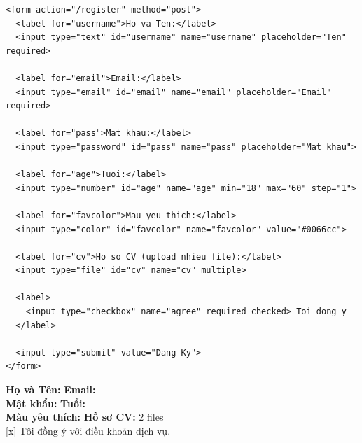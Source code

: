\begin{codeWindow}
\begin{lstlisting}[language=HTML5]
<form action="/register" method="post">
  <label for="username">Ho va Ten:</label>
  <input type="text" id="username" name="username" placeholder="Ten" required>
  
  <label for="email">Email:</label>
  <input type="email" id="email" name="email" placeholder="Email" required>
  
  <label for="pass">Mat khau:</label>
  <input type="password" id="pass" name="pass" placeholder="Mat khau">
  
  <label for="age">Tuoi:</label>
  <input type="number" id="age" name="age" min="18" max="60" step="1">
  
  <label for="favcolor">Mau yeu thich:</label>
  <input type="color" id="favcolor" name="favcolor" value="#0066cc">
  
  <label for="cv">Ho so CV (upload nhieu file):</label>
  <input type="file" id="cv" name="cv" multiple>
  
  <label>
    <input type="checkbox" name="agree" required checked> Toi dong y
  </label>
  
  <input type="submit" value="Dang Ky">
</form>
\end{lstlisting}
\end{codeWindow}

\begin{browserWindow}
\sffamily\small
\begin{tcolorbox}[colback=white, colframe=primaryBlue!20, arc=4pt, boxrule=0.6pt, left=8pt, right=8pt, top=8pt, bottom=8pt]
  \textbf{Họ và Tên:} \; \tcbox[on line, arc=3pt, colback=codeBg, colframe=codeBorder, boxsep=2pt, left=6pt, right=20pt]{\textcolor{darkText}{Nguyễn Văn A}} \qquad
  \textbf{Email:} \; \tcbox[on line, arc=3pt, colback=codeBg, colframe=codeBorder, boxsep=2pt, left=6pt, right=20pt]{\textcolor{darkText}{a@example.com}} \\[6pt]
  \textbf{Mật khẩu:} \; \tcbox[on line, arc=3pt, colback=codeBg, colframe=codeBorder, boxsep=2pt, left=6pt, right=20pt]{\textcolor{darkText}{$\bullet\bullet\bullet\bullet\bullet\bullet$}} \qquad
  \textbf{Tuổi:} \;  \\[6pt]
  \textbf{Màu yêu thích:} \;  \qquad
  \textbf{Hồ sơ CV:} \;  \; \textcolor{codeComment}{2 files} \\[8pt]
  [x] Tôi đồng ý với điều khoản dịch vụ. \\[10pt]
\end{tcolorbox}
\end{browserWindow}

